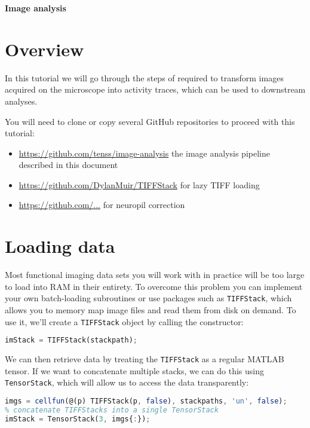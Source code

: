 \documentclass[a4paper]{report}
\begin{document}
\addtocounter{exercises}{1}

\begin{center}
\textbf{\Large{Image analysis}}
\end{center}	
\section{Overview}
In this tutorial we will go through the steps of required to transform images acquired on the microscope into activity traces, which can be used to downstream analyses.

You will need to clone or copy several GitHub repositories to proceed with this tutorial:
\begin{itemize}
	\item \href{https://github.com/tenss/image-analysis}{https://github.com/tenss/image-analysis} the image analysis pipeline described in this document 
	\item \href{https://github.com/DylanMuir/TIFFStack}{https://github.com/DylanMuir/TIFFStack} for lazy TIFF loading 
	\item \href{https://github.com/...}{https://github.com/...} for neuropil correction
\end{itemize} 

\section{Loading data}
Most functional imaging data sets you will work with in practice will be too large to load into RAM in their entirety. 
To overcome this problem you can implement your own batch-loading subroutines or use packages such as \texttt{TIFFStack}, which allows you to memory map image files and read them from disk on demand. 
To use it, we'll create a \texttt{TIFFStack} object by calling the constructor:
\begin{lstlisting}[language=Octave]
imStack = TIFFStack(stackpath);
\end{lstlisting}
We can then retrieve data by treating the \texttt{TIFFStack} as a regular MATLAB tensor.
If we want to concatenate multiple stacks, we can do this using \texttt{TensorStack}, which will allow us to access the data transparently:
\begin{lstlisting}[language=Octave]
% create a TIFFStack for each file
imgs = cellfun(@(p) TIFFStack(p, false), stackpaths, 'un', false);
% concatenate TIFFStacks into a single TensorStack
imStack = TensorStack(3, imgs{:});
\end{lstlisting}
\end{document}
